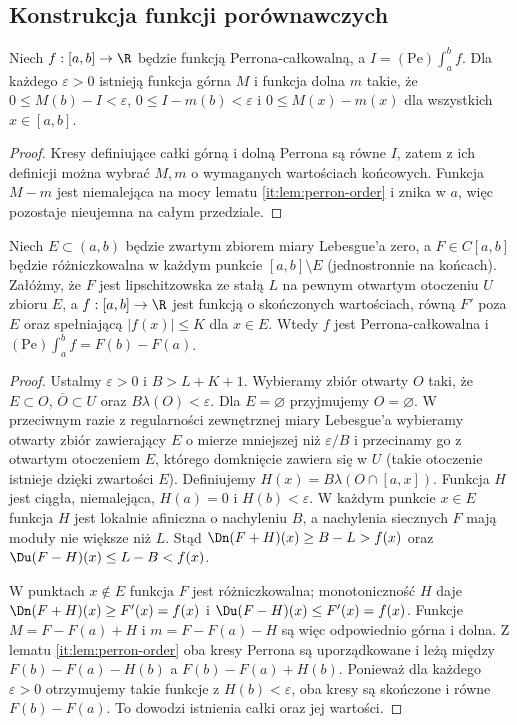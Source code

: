 \subsection*{Konstrukcja funkcji porównawczych}
\begin{lemat}\label{lem:perron-scisle}
Niech $f:[a,b]\to\R$ będzie funkcją Perrona-całkowalną, a $I=(\mathrm{Pe})\int_a^b f$. Dla każdego $\varepsilon>0$ istnieją funkcja górna $M$ i funkcja dolna $m$ takie, że
$0\le M(b)-I<\varepsilon$, $0\le I-m(b)<\varepsilon$ i $0\le M(x)-m(x)$ dla wszystkich $x\in[a,b]$.
\end{lemat}
\begin{proof}
Kresy definiujące całki górną i dolną Perrona są równe $I$, zatem z ich definicji można wybrać $M,m$ o wymaganych wartościach końcowych. Funkcja $M-m$ jest niemalejąca na mocy lematu \ref{it:lem:perron-order} i znika w $a$, więc pozostaje nieujemna na całym przedziale.
\end{proof}
\begin{twierdzenie}\label{tw:perron-wyjatki}
Niech $E\subset(a,b)$ będzie zwartym zbiorem miary Lebesgue'a zero, a $F\in C[a,b]$ będzie różniczkowalna w każdym punkcie $[a,b]\setminus E$ (jednostronnie na końcach). Załóżmy, że $F$ jest lipschitzowska ze stałą $L$ na pewnym otwartym otoczeniu $U$ zbioru $E$, a $f:[a,b]\to\R$ jest funkcją o skończonych wartościach, równą $F'$ poza $E$ oraz spełniającą $|f(x)|\le K$ dla $x\in E$. Wtedy $f$ jest Perrona-całkowalna i
$(\mathrm{Pe})\int_a^b f=F(b)-F(a)$.
\end{twierdzenie}
\begin{proof}
Ustalmy $\varepsilon>0$ i $B>L+K+1$. Wybieramy zbiór otwarty $O$ taki, że $E\subset O$, $\overline O\subset U$ oraz $B\lambda(O)<\varepsilon$. Dla $E=\varnothing$ przyjmujemy $O=\varnothing$. W przeciwnym razie z regularności zewnętrznej miary Lebesgue'a wybieramy otwarty zbiór zawierający $E$ o mierze mniejszej niż $\varepsilon/B$ i przecinamy go z otwartym otoczeniem $E$, którego domknięcie zawiera się w $U$ (takie otoczenie istnieje dzięki zwartości $E$). Definiujemy $H(x)=B\lambda(O\cap[a,x])$. Funkcja $H$ jest ciągła, niemalejąca, $H(a)=0$ i $H(b)<\varepsilon$. W każdym punkcie $x\in E$ funkcja $H$ jest lokalnie afiniczna o nachyleniu $B$, a nachylenia siecznych $F$ mają moduły nie większe niż $L$. Stąd $\Dn(F+H)(x)\ge B-L>f(x)$ oraz $\Du(F-H)(x)\le L-B<f(x)$.

W punktach $x\notin E$ funkcja $F$ jest różniczkowalna; monotoniczność $H$ daje $\Dn(F+H)(x)\ge F'(x)=f(x)$ i $\Du(F-H)(x)\le F'(x)=f(x)$. Funkcje $M=F-F(a)+H$ i $m=F-F(a)-H$ są więc odpowiednio górna i dolna. Z lematu \ref{it:lem:perron-order} oba kresy Perrona są uporządkowane i leżą między $F(b)-F(a)-H(b)$ a $F(b)-F(a)+H(b)$. Ponieważ dla każdego $\varepsilon>0$ otrzymujemy takie funkcje z $H(b)<\varepsilon$, oba kresy są skończone i równe $F(b)-F(a)$. To dowodzi istnienia całki oraz jej wartości.
\end{proof}
